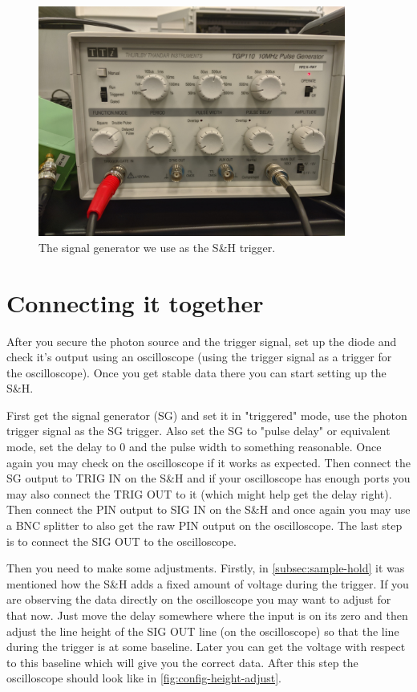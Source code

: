 \documentclass[a4paper, 10pt]{article}
\begin{document}
\begin{figure}[H]
    \centering
    \includegraphics[width=0.9\textwidth]{./images/signal-generator.jpg}
    \caption{The signal generator we use as the S\&H trigger.}
    \label{fig:signal-generator}
\end{figure}

\section{Connecting it together}\label{sec:connecting}
After you secure the photon source and the trigger signal, set up the diode and check it's output using an oscilloscope (using the trigger signal as a trigger for the oscilloscope).
Once you get stable data there you can start setting up the S\&H.

First get the signal generator (SG) and set it in "triggered" mode, use the photon trigger signal as the SG trigger.
Also set the SG to "pulse delay" or equivalent mode, set the delay to 0 and the pulse width to something reasonable.
Once again you may check on the oscilloscope if it works as expected.
Then connect the SG output to TRIG IN on the S\&H and if your oscilloscope has enough ports you may also connect the TRIG OUT to it (which might help get the delay right).
Then connect the PIN output to SIG IN on the S\&H and once again you may use a BNC splitter to also get the raw PIN output on the oscilloscope.
The last step is to connect the SIG OUT to the oscilloscope.

Then you need to make some adjustments.
Firstly, in \cref{subsec:sample-hold} it was mentioned how the S\&H adds a fixed amount of voltage during the trigger.
If you are observing the data directly on the oscilloscope you may want to adjust for that now.
Just move the delay somewhere where the input is on its zero and then adjust the line height of the SIG OUT line (on the oscilloscope) so that the line during the trigger is at some baseline.
Later you can get the voltage with respect to this baseline which will give you the correct data.
After this step the oscilloscope should look like in \cref{fig:config-height-adjust}.
\end{document}

